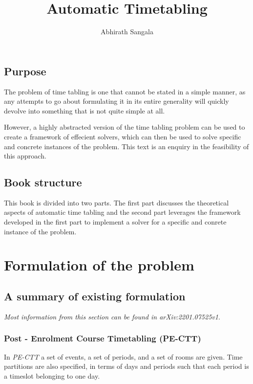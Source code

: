 \documentclass[11pt]{book}
\title{\Huge\textbf{Automatic Timetabling}}
\author{Abhirath Sangala}
\date{}
\begin{document}
\maketitle

\section*{Purpose}
The problem of time tabling is one that cannot be stated in a simple manner, as any attempts to go about formulating it in its entire generality will quickly devolve into something that is not quite simple at all.

However, a highly abstracted version of the time tabling problem can be used to create a framework of effecient solvers, which can then be used to solve specific and concrete instances of the problem. This text is an enquiry in the feasibility of this approach.

\section*{Book structure}
This book is divided into two parts. The first part discusses the theoretical aspects of automatic time tabling and the second part leverages the framework developed in the first part to implement a solver for a specific and conrete instance of the problem.

\chapter{Formulation of the problem}

\section{A summary of existing formulation}

\textit{Most information from this section can be found in arXiv:2201.07525v1}. 

\subsection{Post - Enrolment Course Timetabling (PE-CTT)}
In \textit{PE-CTT} a set of events, a set of periods, and a set of rooms are given. Time partitions are also specified, in terms of days and periods such that each period is a timeslot belonging to one day. 
\end{document}
